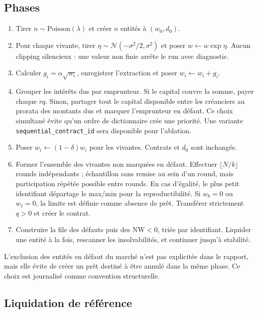 \documentclass[11pt,a4paper]{article}
\newcommand{\NW}{\mathrm{NW}}
\newcommand{\code}[1]{\texttt{#1}}
\begin{document}
\subsection{Phases}

\begin{enumerate}
  \item Tirer $n\sim\mathrm{Poisson}(\lambda)$ et créer $n$ entités à
  $(w_0,d_0)$.
  \item Pour chaque vivante, tirer
  $\eta\sim\mathcal N(-\sigma^2/2,\sigma^2)$ et poser
  $w\leftarrow w\exp\eta$. Aucun clipping silencieux : une valeur non finie
  arrête le run avec diagnostic.
  \item Calculer $g_i=\alpha\sqrt{w_i}$, enregistrer l'extraction et poser
  $w_i\leftarrow w_i+g_i$.
  \item Grouper les intérêts dus par emprunteur. Si le capital couvre la somme,
  payer chaque $rq$. Sinon, partager tout le capital disponible entre les
  créanciers au prorata des montants dus et marquer l'emprunteur en défaut. Ce
  choix simultané évite qu'un ordre de dictionnaire crée une priorité. Une
  variante \code{sequential\_contract\_id} sera disponible pour l'ablation.
  \item Poser $w_i\leftarrow(1-\delta)w_i$ pour les vivantes. Contrats et $d_0$
  sont inchangés.
  \item Former l'ensemble des vivantes non marquées en défaut. Effectuer
  $\lfloor N/k\rfloor$ rounds indépendants ; échantillon sans remise au sein
  d'un round, mais participation répétée possible entre rounds. En cas d'égalité,
  le plus petit identifiant départage le max/min pour la reproductibilité. Si
  $w_b=0$ ou $w_\ell=0$, la limite est définie comme absence de prêt. Transférer
  strictement $q>0$ et créer le contrat.
  \item Construire la file des défauts puis des $\NW<0$, triée par identifiant.
  Liquider une entité à la fois, rescanner les insolvabilités, et continuer
  jusqu'à stabilité.
\end{enumerate}

L'exclusion des entités en défaut du marché n'est pas explicitée dans le rapport,
mais elle évite de créer un prêt destiné à être annulé dans la même phase. Ce
choix est journalisé comme convention structurelle.

\subsection{Liquidation de référence}
\end{document}
